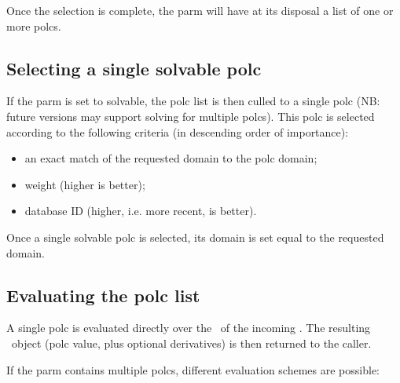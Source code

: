   Once the selection is complete, the parm will have at its disposal a list of
  one or more polcs. 

\subsection{Selecting a single solvable polc}
  
  If the parm is set to solvable, the polc list is then culled to a single polc
  (NB: future versions may support solving for multiple polcs). This polc is
  selected according to the following criteria (in descending order of
  importance):

  \begin{itemize}
  
  \item an exact match of the requested domain to the polc domain;
  
  \item weight (higher is better);
  
  \item database ID (higher, i.e. more recent, is better).
  
  \end{itemize}
  
  Once a single solvable polc is selected, its domain is set equal to the
  requested domain.
  
\subsection{Evaluating the polc list}

  A single polc is evaluated directly over the \Cells\ of the incoming
  \Request. The resulting \VellSet\ object (polc value, plus optional
  derivatives) is then returned to the caller. 
  
  If the parm contains multiple polcs, different evaluation schemes are
  possible:


